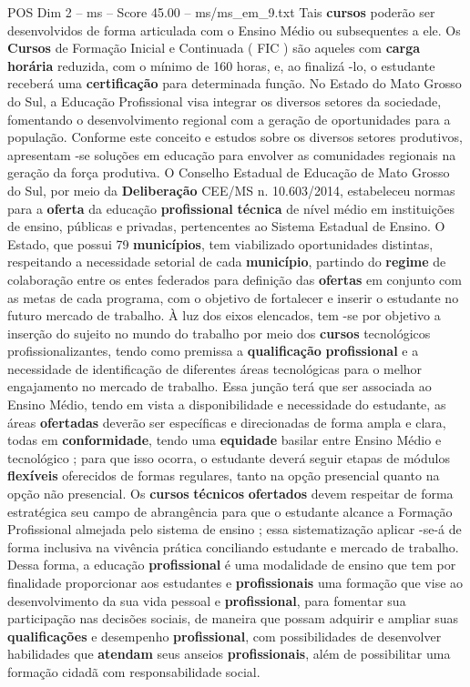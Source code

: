 \begin{textsample}{POS Dim 2 – ms – Score 45.00 – ms/ms\_em\_9.txt}
Tais \textbf{cursos} poderão ser desenvolvidos de forma articulada com o Ensino Médio ou subsequentes a ele.
Os \textbf{Cursos} de Formação Inicial e Continuada ( FIC ) são aqueles com \textbf{carga} \textbf{horária} reduzida, com o mínimo de 160 horas, e, ao finalizá -lo, o estudante receberá uma \textbf{certificação} para determinada função.
No Estado do Mato Grosso do Sul, a Educação Profissional visa integrar os diversos setores da sociedade, fomentando o desenvolvimento regional com a geração de oportunidades para a população.
Conforme este conceito e estudos sobre os diversos setores produtivos, apresentam -se soluções em educação para envolver as comunidades regionais na geração da força produtiva.
O Conselho Estadual de Educação de Mato Grosso do Sul, por meio da \textbf{Deliberação} CEE/MS n. 10.603/2014, estabeleceu normas para a \textbf{oferta} da educação \textbf{profissional} \textbf{técnica} de nível médio em instituições de ensino, públicas e privadas, pertencentes ao Sistema Estadual de Ensino.
O Estado, que possui 79 \textbf{municípios}, tem viabilizado oportunidades distintas, respeitando a necessidade setorial de cada \textbf{município}, partindo do \textbf{regime} de colaboração entre os entes federados para definição das \textbf{ofertas} em conjunto com as metas de cada programa, com o objetivo de fortalecer e inserir o estudante no futuro mercado de trabalho.
À luz dos eixos elencados, tem -se por objetivo a inserção do sujeito no mundo do trabalho por meio dos \textbf{cursos} tecnológicos profissionalizantes, tendo como premissa a \textbf{qualificação} \textbf{profissional} e a necessidade de identificação de diferentes áreas tecnológicas para o melhor engajamento no mercado de trabalho.
Essa junção terá que ser associada ao Ensino Médio, tendo em vista a disponibilidade e necessidade do estudante, as áreas \textbf{ofertadas} deverão ser específicas e direcionadas de forma ampla e clara, todas em \textbf{conformidade}, tendo uma \textbf{equidade} basilar entre Ensino Médio e tecnológico ; para que isso ocorra, o estudante deverá seguir etapas de módulos \textbf{flexíveis} oferecidos de formas regulares, tanto na opção presencial quanto na opção não presencial.
Os \textbf{cursos} \textbf{técnicos} \textbf{ofertados} devem respeitar de forma estratégica seu campo de abrangência para que o estudante alcance a Formação Profissional almejada pelo sistema de ensino ; essa sistematização aplicar -se-á de forma inclusiva na vivência prática conciliando estudante e mercado de trabalho.
Dessa forma, a educação \textbf{profissional} é uma modalidade de ensino que tem por finalidade proporcionar aos estudantes e \textbf{profissionais} uma formação que vise ao desenvolvimento da sua vida pessoal e \textbf{profissional}, para fomentar sua participação nas decisões sociais, de maneira que possam adquirir e ampliar suas \textbf{qualificações} e desempenho \textbf{profissional}, com possibilidades de desenvolver habilidades que \textbf{atendam} seus anseios \textbf{profissionais}, além de possibilitar uma formação cidadã com responsabilidade social.

\end{textsample}
